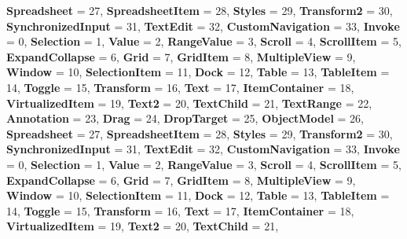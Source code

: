 \begin{DoxyCompactItemize}
{\bfseries Spreadsheet} = 27, 
{\bfseries Spreadsheet\+Item} = 28, 
{\bfseries Styles} = 29, 
\newline
{\bfseries Transform2} = 30, 
{\bfseries Synchronized\+Input} = 31, 
{\bfseries Text\+Edit} = 32, 
{\bfseries Custom\+Navigation} = 33, 
\newline
{\bfseries Invoke} = 0, 
{\bfseries Selection} = 1, 
{\bfseries Value} = 2, 
{\bfseries Range\+Value} = 3, 
\newline
{\bfseries Scroll} = 4, 
{\bfseries Scroll\+Item} = 5, 
{\bfseries Expand\+Collapse} = 6, 
{\bfseries Grid} = 7, 
\newline
{\bfseries Grid\+Item} = 8, 
{\bfseries Multiple\+View} = 9, 
{\bfseries Window} = 10, 
{\bfseries Selection\+Item} = 11, 
\newline
{\bfseries Dock} = 12, 
{\bfseries Table} = 13, 
{\bfseries Table\+Item} = 14, 
{\bfseries Toggle} = 15, 
\newline
{\bfseries Transform} = 16, 
{\bfseries Text} = 17, 
{\bfseries Item\+Container} = 18, 
{\bfseries Virtualized\+Item} = 19, 
\newline
{\bfseries Text2} = 20, 
{\bfseries Text\+Child} = 21, 
{\bfseries Text\+Range} = 22, 
{\bfseries Annotation} = 23, 
\newline
{\bfseries Drag} = 24, 
{\bfseries Drop\+Target} = 25, 
{\bfseries Object\+Model} = 26, 
{\bfseries Spreadsheet} = 27, 
\newline
{\bfseries Spreadsheet\+Item} = 28, 
{\bfseries Styles} = 29, 
{\bfseries Transform2} = 30, 
{\bfseries Synchronized\+Input} = 31, 
\newline
{\bfseries Text\+Edit} = 32, 
{\bfseries Custom\+Navigation} = 33, 
{\bfseries Invoke} = 0, 
{\bfseries Selection} = 1, 
\newline
{\bfseries Value} = 2, 
{\bfseries Range\+Value} = 3, 
{\bfseries Scroll} = 4, 
{\bfseries Scroll\+Item} = 5, 
\newline
{\bfseries Expand\+Collapse} = 6, 
{\bfseries Grid} = 7, 
{\bfseries Grid\+Item} = 8, 
{\bfseries Multiple\+View} = 9, 
\newline
{\bfseries Window} = 10, 
{\bfseries Selection\+Item} = 11, 
{\bfseries Dock} = 12, 
{\bfseries Table} = 13, 
\newline
{\bfseries Table\+Item} = 14, 
{\bfseries Toggle} = 15, 
{\bfseries Transform} = 16, 
{\bfseries Text} = 17, 
\newline
{\bfseries Item\+Container} = 18, 
{\bfseries Virtualized\+Item} = 19, 
{\bfseries Text2} = 20, 
{\bfseries Text\+Child} = 21, 

\end{DoxyCompactItemize}
